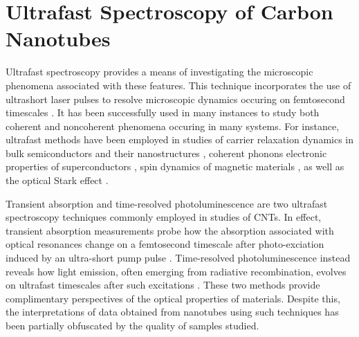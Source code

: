 \section{Ultrafast Spectroscopy of Carbon Nanotubes}

Ultrafast spectroscopy provides a means of investigating the microscopic phenomena associated with these features. This technique incorporates the use of ultrashort laser pulses to resolve microscopic dynamics occuring on femtosecond timescales \cite{shah1996ultrafast}. It has been successfully used in many instances to study both coherent and noncoherent phenomena occuring in many systems. For instance, ultrafast methods have been employed in studies of carrier relaxation dynamics in bulk semiconductors \cite{beard2000transient, hendry2007exciton, pijpers2009assessment} and their nanostructures \cite{johar2019ultrafast, zhang1997ultrafast, hopper2018ultrafast}, coherent phonons \cite{farztdinov1997spectral, melnikov2018coherent} electronic properties of superconductors \cite{zhang2016stimulated, kaindl2005dynamics, mankowsky2014nonlinear}, spin dynamics of magnetic materials \cite{beaurepaire1996ultrafast, kirilyuk2010ultrafast, kim2016ultrafast}, as well as the optical Stark effect \cite{von1986optical, frohlich1985observation, sie2015valley}.

Transient absorption and time-resolved photoluminescence are two ultrafast spectroscopy techniques commonly employed in studies of CNTs. In effect, transient absorption measurements probe how the absorption associated with optical resonances change on a femtosecond timescale after photo-exciation induced by an ultra-short pump pulse \cite{shah1996ultrafast}. Time-resolved photoluminescence instead reveals how light emission, often emerging from radiative recombination, evolves on ultrafast timescales after such excitations \cite{shah1996ultrafast}. These two methods provide complimentary perspectives of the optical properties of materials. Despite this, the interpretations of data obtained from nanotubes using such techniques has been partially obfuscated by the quality of samples studied.

